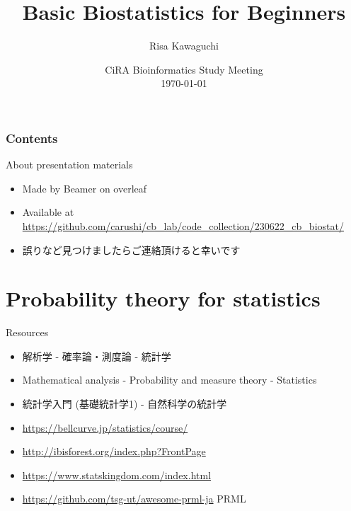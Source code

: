 \documentclass[cjk, aspectratio=169]{beamer}
\def\meetingname{CiRA Bioinformatics Study Meeting}
\begin{document}
\title[Beamer]{Basic Biostatistics for Beginners}
\author[RK]{Risa Kawaguchi} 
\date[\mydate]{\meetingname\\\today}



\begin{frame}
\titlepage
\end{frame}


\begin{frame}
\frametitle{Contents}
\tableofcontents
\end{frame}

\begin{frame}{About presentation materials}
\begin{itemize}
\item Made by Beamer on overleaf
\item Available at \url{https://github.com/carushi/cb_lab/code_collection/230622_cb_biostat/}
\item 誤りなど見つけましたらご連絡頂けると幸いです
\end{itemize}
\end{frame}

\section{Probability theory for statistics}
\begin{frame}{Resources}
\begin{itemize}
\item 解析学 - 確率論・測度論 - 統計学
\item Mathematical analysis - Probability and measure theory - Statistics
\item 統計学入門 (基礎統計学1) - 自然科学の統計学
\item \url{https://bellcurve.jp/statistics/course/}
\item \url{http://ibisforest.org/index.php?FrontPage}
\item \url{https://www.statskingdom.com/index.html}
\item \url{https://github.com/tsg-ut/awesome-prml-ja} PRML
\end{itemize}
\end{frame}
\end{document}
